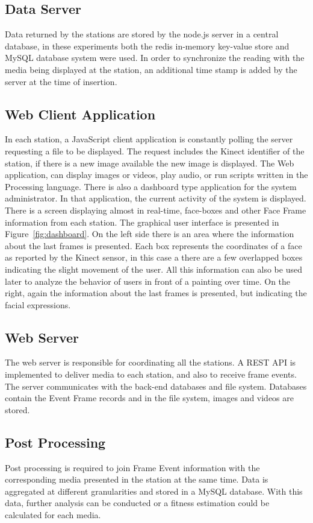 \documentclass[graybox]{svmult}
\begin{document}
\subsection{Data Server}
Data returned by the stations are stored by the node.js server in a central database, in these experiments both the redis in-memory key-value store and MySQL database system were used. In order to synchronize the reading with the media being displayed at the station, an additional time stamp is added by the server at the time of insertion.

\subsection{Web Client Application} 
In each station, a JavaScript client application is constantly polling the server requesting a file to be displayed. The request includes the Kinect identifier of the station, if there is a new image available the new image is displayed. The Web application, can display images or videos, play audio, or run scripts written in the Processing language.  There is also a dashboard type application for the system administrator. In that application, the current activity of the system is displayed. There is a screen displaying almost in real-time, face-boxes and other Face Frame information from each station. The graphical user interface is presented in Figure~\ref{fig:dashboard}.
On the left side there is an area where the information about the last frames is presented. Each box represents the coordinates of a face as reported by the Kinect sensor, in this case a there are a few overlapped boxes indicating the slight movement of the user. All this information can also be used later to analyze the behavior of users in front of a painting over time. On the right, again the information about the last frames is presented, but indicating the facial expressions.


\subsection{Web Server}
The web server is responsible for coordinating all the stations. A REST API is implemented to deliver media to each station, and also to receive frame events. The server communicates with the back-end databases and file system. Databases contain the Event Frame records and in the file system, images and videos are stored.


\subsection{Post Processing}
Post processing is required to join Frame Event information with the corresponding media presented in the station at the same time. Data is aggregated at different granularities and stored in a MySQL database. With this data, further analysis can be conducted or a fitness estimation could be calculated for each media.     
\end{document}
